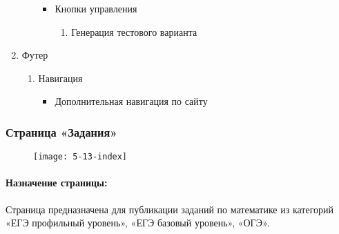\begin{enumerate}
\begin{enumerate}
\begin{itemize}
		\item Кнопки управления
		\begin{enumerate}
			\item Генерация тестового варианта
		\end{enumerate}
		\end{itemize}
	\end{enumerate}

	\item Футер
	\begin{enumerate}
		\item Навигация
		\begin{itemize}
			\item Дополнительная навигация по сайту
		\end{itemize}
	\end{enumerate}
\end{enumerate}


\subsubsection{Страница «Задания»}
\begin{figure}[H]
	\texttt{[image: 5-13-index]}
\end{figure}
\paragraph{Назначение страницы:} Страница предназначена для публикации заданий по математике из категорий «ЕГЭ профильный уровень», «ЕГЭ базовый уровень», «ОГЭ».

